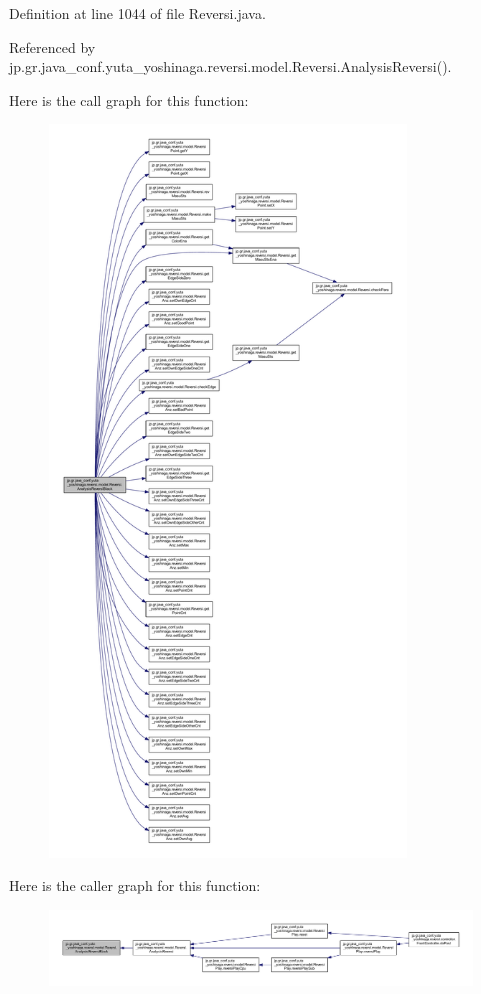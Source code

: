 Definition at line 1044 of file Reversi.\+java.



Referenced by jp.\+gr.\+java\+\_\+conf.\+yuta\+\_\+yoshinaga.\+reversi.\+model.\+Reversi.\+Analysis\+Reversi().

Here is the call graph for this function\+:
\nopagebreak
\begin{figure}[H]
\begin{center}
\leavevmode
\includegraphics[height=550pt]{classjp_1_1gr_1_1java__conf_1_1yuta__yoshinaga_1_1reversi_1_1model_1_1_reversi_adb74246f49150e02201766a1fa6cf732_cgraph}
\end{center}
\end{figure}
Here is the caller graph for this function\+:
\nopagebreak
\begin{figure}[H]
\begin{center}
\leavevmode
\includegraphics[width=350pt]{classjp_1_1gr_1_1java__conf_1_1yuta__yoshinaga_1_1reversi_1_1model_1_1_reversi_adb74246f49150e02201766a1fa6cf732_icgraph}
\end{center}
\end{figure}
